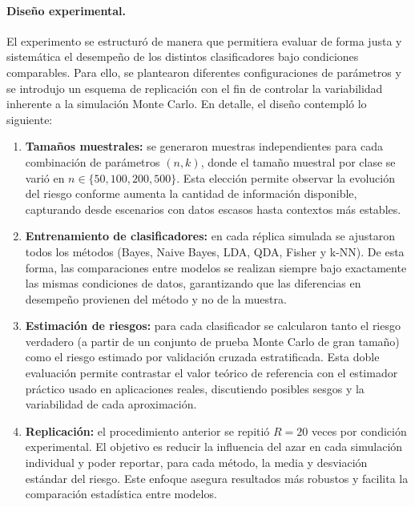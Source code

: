 \documentclass[10pt]{article}
\begin{document}
\paragraph{Diseño experimental.}
El experimento se estructuró de manera que permitiera evaluar de forma justa y sistemática el desempeño de los distintos clasificadores bajo condiciones comparables. Para ello, se plantearon diferentes configuraciones de parámetros y se introdujo un esquema de replicación con el fin de controlar la variabilidad inherente a la simulación Monte Carlo. En detalle, el diseño contempló lo siguiente:

\begin{enumerate}
    \item \textbf{Tamaños muestrales:} se generaron muestras independientes para cada combinación de parámetros $(n,k)$, donde el tamaño muestral por clase se varió en $n \in \{50, 100, 200, 500\}$. Esta elección permite observar la evolución del riesgo conforme aumenta la cantidad de información disponible, capturando desde escenarios con datos escasos hasta contextos más estables.
    
    \item \textbf{Entrenamiento de clasificadores:} en cada réplica simulada se ajustaron todos los métodos (Bayes, Naive Bayes, LDA, QDA, Fisher y k-NN). De esta forma, las comparaciones entre modelos se realizan siempre bajo exactamente las mismas condiciones de datos, garantizando que las diferencias en desempeño provienen del método y no de la muestra.
    
    \item \textbf{Estimación de riesgos:} para cada clasificador se calcularon tanto el riesgo verdadero (a partir de un conjunto de prueba Monte Carlo de gran tamaño) como el riesgo estimado por validación cruzada estratificada. Esta doble evaluación permite contrastar el valor teórico de referencia con el estimador práctico usado en aplicaciones reales, discutiendo posibles sesgos y la variabilidad de cada aproximación.
    
    \item \textbf{Replicación:} el procedimiento anterior se repitió $R=20$ veces por condición experimental. El objetivo es reducir la influencia del azar en cada simulación individual y poder reportar, para cada método, la media y desviación estándar del riesgo. Este enfoque asegura resultados más robustos y facilita la comparación estadística entre modelos.
\end{enumerate}
\end{document}
